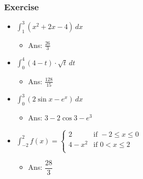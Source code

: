 \documentclass[t]{beamer}
\theoremstyle{plain}
\theoremstyle{definition}
\newcommand{\ds}{\displaystyle}
\newcounter{heading}
\newcommand{\newhead}[1]{\medskip\stepcounter{heading}\noindent\textbf{\hspace{0.2cm}{#1}.}}
\begin{document}
\begin{frame}

\frametitle{Exercise}
 
 \begin{itemize}
	\item  $\ds\int_{1}^{3} (x^2 + 2x -4) \,dx$
	\begin{itemize}
		\item Ans: $\frac{26}{3}$
	\end{itemize}
	\item $\ds\int_{0}^{4} (4-t)\cdot \sqrt{t} \,dt$
	\begin{itemize}
		\item Ans: $\frac{128}{15}$
	\end{itemize}
	\item $\ds\int_{0}^{3} (2\sin{x} - e^x) \,dx$
	\begin{itemize}
		\item Ans: $3 - 2\cos{3} - e^3$
	\end{itemize}
	\item $\ds\int_{-2}^{2} f(x) = \begin{cases}
       2 & \text{if } -2 \leq x \leq 0\\
       4 - x^2 & \text{if } 0 < x \leq 2\\
        \end{cases}$
	\begin{itemize}
		\item Ans: $\dfrac{28}{3}$
	\end{itemize}
\end{itemize}

\end{frame}
%
\end{document}
